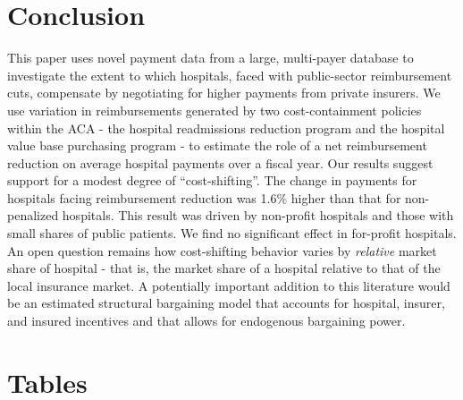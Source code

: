 \documentclass[12pt]{article}
\begin{document}
\section{Conclusion}
\label{sec:Conclusion}
This paper uses novel payment data from a large, multi-payer database to investigate the extent to which hospitals, faced with public-sector reimbursement cuts, compensate by negotiating for higher payments from private insurers.  We use variation in reimbursements generated by two cost-containment policies within the ACA - the hospital readmissions reduction program and the hospital value base purchasing program - to estimate the role of a net reimbursement reduction on average hospital payments over a fiscal year.  Our results suggest support for a modest degree of ``cost-shifting''.  The change in payments for hospitals facing reimbursement reduction was 1.6$\%$ higher than that for non-penalized hospitals.  This result was driven by non-profit hospitals and those with small shares of public patients.  We find no significant effect in for-profit hospitals.  An open question remains how cost-shifting behavior varies by \textit{relative} market share of hospital - that is, the market share of a hospital relative to that of the local insurance market.  A potentially important addition to this literature would be an estimated structural bargaining model that accounts for hospital, insurer, and insured incentives and that allows for endogenous bargaining power.



\newpage




\clearpage
\newpage
\appendix
\section{Tables}
\label{app:tables}
\end{document}
